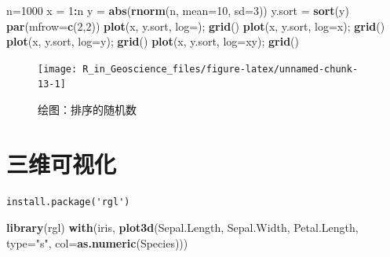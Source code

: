\documentclass[]{scrbook}
\newenvironment{Shaded}{\begin{snugshade}}{\end{snugshade}}
\newcommand{\DataTypeTok}[1]{\textcolor[rgb]{0.13,0.29,0.53}{#1}}
\newcommand{\DecValTok}[1]{\textcolor[rgb]{0.00,0.00,0.81}{#1}}
\newcommand{\KeywordTok}[1]{\textcolor[rgb]{0.13,0.29,0.53}{\textbf{#1}}}
\newcommand{\NormalTok}[1]{#1}
\newcommand{\OperatorTok}[1]{\textcolor[rgb]{0.81,0.36,0.00}{\textbf{#1}}}
\newcommand{\StringTok}[1]{\textcolor[rgb]{0.31,0.60,0.02}{#1}}
\begin{document}
\begin{Shaded}
\begin{Highlighting}[]
\NormalTok{n=}\DecValTok{1000}
\NormalTok{x =}\StringTok{ }\DecValTok{1}\OperatorTok{:}\NormalTok{n}
\NormalTok{y =}\StringTok{ }\KeywordTok{abs}\NormalTok{(}\KeywordTok{rnorm}\NormalTok{(n, }\DataTypeTok{mean=}\DecValTok{10}\NormalTok{, }\DataTypeTok{sd=}\DecValTok{3}\NormalTok{))}
\NormalTok{y.sort =}\StringTok{ }\KeywordTok{sort}\NormalTok{(y)}
\KeywordTok{par}\NormalTok{(}\DataTypeTok{mfrow=}\KeywordTok{c}\NormalTok{(}\DecValTok{2}\NormalTok{,}\DecValTok{2}\NormalTok{))}
\KeywordTok{plot}\NormalTok{(x, y.sort, }\DataTypeTok{log=}\StringTok{\textquotesingle{}\textquotesingle{}}\NormalTok{); }\KeywordTok{grid}\NormalTok{()}
\KeywordTok{plot}\NormalTok{(x, y.sort, }\DataTypeTok{log=}\StringTok{\textquotesingle{}x\textquotesingle{}}\NormalTok{); }\KeywordTok{grid}\NormalTok{()}
\KeywordTok{plot}\NormalTok{(x, y.sort, }\DataTypeTok{log=}\StringTok{\textquotesingle{}y\textquotesingle{}}\NormalTok{); }\KeywordTok{grid}\NormalTok{()}
\KeywordTok{plot}\NormalTok{(x, y.sort, }\DataTypeTok{log=}\StringTok{\textquotesingle{}xy\textquotesingle{}}\NormalTok{); }\KeywordTok{grid}\NormalTok{()}
\end{Highlighting}
\end{Shaded}

\begin{figure}

{\centering \texttt{[image: R\_in\_Geoscience\_files/figure-latex/unnamed-chunk-13-1]} 

}

\caption{绘图：排序的随机数}\label{fig:unnamed-chunk-13}
\end{figure}

\hypertarget{ux4e09ux7ef4ux53efux89c6ux5316}{%
\section{三维可视化}\label{ux4e09ux7ef4ux53efux89c6ux5316}}

\begin{verbatim}
install.package('rgl')
\end{verbatim}

\begin{Shaded}
\begin{Highlighting}[]
\KeywordTok{library}\NormalTok{(rgl)}
\KeywordTok{with}\NormalTok{(iris, }\KeywordTok{plot3d}\NormalTok{(Sepal.Length, Sepal.Width, Petal.Length, }
                  \DataTypeTok{type=}\StringTok{"s"}\NormalTok{, }\DataTypeTok{col=}\KeywordTok{as.numeric}\NormalTok{(Species)))}
\end{Highlighting}
\end{Shaded}
\end{document}
